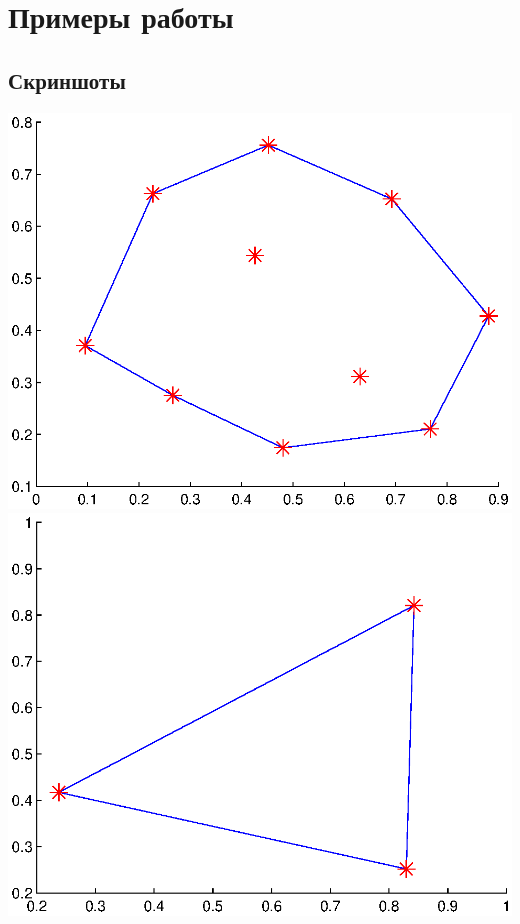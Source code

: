 \documentclass[11pt]{article}
\begin{document}
\section{Примеры работы}
\subsection{Скриншоты}
\includegraphics[scale=0.5]{pict1.eps}
\includegraphics[scale=0.5]{pict2.eps} \newline
\end{document}
